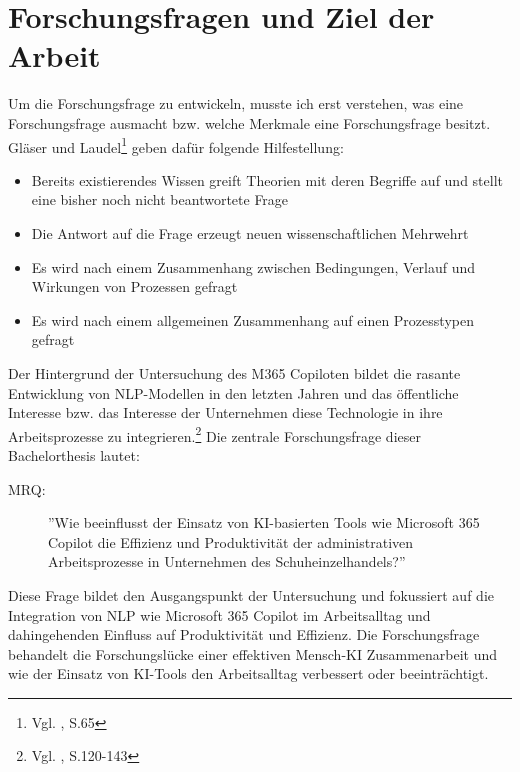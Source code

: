 
\section{Forschungsfragen und Ziel der Arbeit}

Um die Forschungsfrage zu entwickeln, musste ich erst verstehen, was eine Forschungsfrage ausmacht bzw. welche Merkmale eine Forschungsfrage besitzt. Gläser und Laudel\footnote{Vgl. \cite{Glaeser2010}, S.65} geben dafür folgende Hilfestellung:
\begin{itemize}
    \item Bereits existierendes Wissen greift Theorien mit deren Begriffe auf und stellt eine bisher noch nicht beantwortete Frage
    \item Die Antwort auf die Frage erzeugt neuen wissenschaftlichen Mehrwehrt
    \item Es wird nach einem Zusammenhang zwischen Bedingungen, Verlauf und Wirkungen von Prozessen gefragt
    \item Es wird nach einem allgemeinen Zusammenhang auf einen Prozesstypen gefragt
\end{itemize}

Der Hintergrund der Untersuchung des M365 Copiloten bildet die rasante Entwicklung von NLP-Modellen in den letzten Jahren und das öffentliche Interesse bzw. das Interesse der Unternehmen diese Technologie in ihre Arbeitsprozesse zu integrieren.\footnote{Vgl. \cite{Syed2020}, S.120-143}
Die zentrale Forschungsfrage dieser Bachelorthesis lautet:

\begin{description}
    \item[MRQ:] ''Wie beeinflusst der Einsatz von KI-basierten Tools wie Microsoft 365 Copilot die Effizienz und Produktivität der administrativen Arbeitsprozesse in Unternehmen des Schuheinzelhandels?''
\end{description}

Diese Frage bildet den Ausgangspunkt der Untersuchung und fokussiert auf die Integration von NLP wie Microsoft 365 Copilot im Arbeitsalltag und dahingehenden Einfluss auf Produktivität und Effizienz. Die Forschungsfrage behandelt die Forschungslücke einer effektiven Mensch-KI Zusammenarbeit und wie der Einsatz von KI-Tools den Arbeitsalltag verbessert oder beeinträchtigt.

